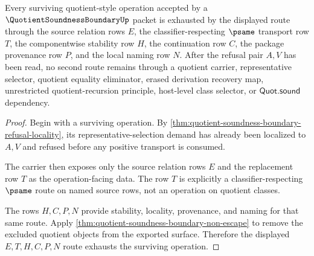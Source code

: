 \begin{theorem}
\label{thm:quotient-soundness-boundary-psame-transport-exhaustion}
Every surviving quotient-style operation accepted by a $\QuotientSoundnessBoundaryUp$ packet is exhausted by the displayed route through the source relation rows $E$, the classifier-respecting $\psame$ transport row $T$, the componentwise stability row $H$, the continuation row $C$, the package provenance row $P$, and the local naming row $N$. After the refusal pair $A,V$ has been read, no second route remains through a quotient carrier, representative selector, quotient equality eliminator, erased derivation recovery map, unrestricted quotient-recursion principle, host-level class selector, or $\mathsf{Quot.sound}$ dependency.
\end{theorem}
\begin{proof}
Begin with a surviving operation. By \autoref{thm:quotient-soundness-boundary-refusal-locality}, its representative-selection demand has already been localized to $A,V$ and refused before any positive transport is consumed.

The carrier then exposes only the source relation rows $E$ and the replacement row $T$ as the operation-facing data. The row $T$ is explicitly a classifier-respecting $\psame$ route on named source rows, not an operation on quotient classes.

The rows $H,C,P,N$ provide stability, locality, provenance, and naming for that same route. Apply \autoref{thm:quotient-soundness-boundary-non-escape} to remove the excluded quotient objects from the exported surface. Therefore the displayed $E,T,H,C,P,N$ route exhausts the surviving operation.
\end{proof}

